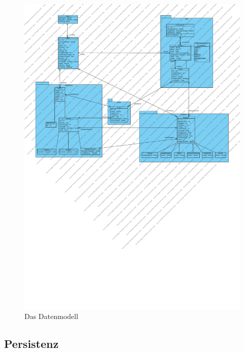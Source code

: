\documentclass[fontsize=12pt,paper=a4,twoside]{scrartcl}
\begin{document}
\begin{figure}[H]
\begin{center}
  \includegraphics[width=\linewidth]{../GT_Modulsicht/src/Modelsicht.pdf}
    \caption{Das Datenmodell}
\end{center}
\end{figure}

\subsection{Persistenz}
\end{document}
